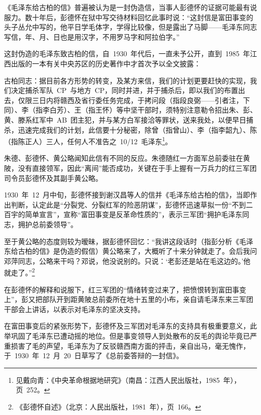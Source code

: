 《毛泽东给古柏的信》普遍被认为是一封伪造信，当事人彭德怀的证据可能最有说服力。数十年后，彭德怀在狱中写交待材料回忆此事时说：“这封信是富田事变的头子丛允中写的，他平日学毛体字，学得比较像，但是露出了马脚——毛泽东同志写信，年、月、日也是用汉字，不用罗马字和阿拉伯字。”

这封伪造的毛泽东致古柏的信，自~1930~年代后，一直未予公开，直到~1985~年江西出版的一本有关中央苏区的历史著作中才首次予以全文披露：

\begin{quoting}
古柏同志：据目前各方形势的转变，及某方来信，我们的计划更要赶快的实现，我们决定捕杀军队~CP~与地方~CP，同时并进，并于捕杀后，即以我们的布置出去，仅限三日内将赣西及省行委任务完成，于拷问段（指段良弼——引者注，下同）、李（指李白芳）、王（指王怀）等中坚干部时，须特别注意勒令招出朱、彭、黄、滕系红军中~AB~团主犯，并与某方白军接洽等罪状，送来我处，以便早日捕杀，迅速完成我们的计划，此信要十分秘密，除曾（指曾山）、李（指李韶九）、陈（指陈正人）三人，任何人不准告之~10/12~毛泽东\footnote{见戴向青：《中央革命根据地研究》（南昌：江西人民出版社，1985~年），页~252。}。
\end{quoting}

朱德、彭德怀、黄公略闻知此信有不同的反应。朱德随红一方面军总前委驻在黄陂，没有直接领军，因此“离间”能否成功，关键在于手上握有一万兵力的红三军团司令员彭德怀及其副手黄公略。

1930~年~12~月中旬，彭德怀接到谢汉昌等人的信并《毛泽东给古柏的信》，当即作出判断，认定此是“分裂党、分裂红军的险恶阴谋”，彭德怀迅速草拟一份“不到二百宇的简单宣言”，宣称“富田事变是反革命性质的”，表示三军团“拥护毛泽东同志，拥护总前委领导”。

至于黄公略的态度则较为暧昧，据彭德怀回忆：“我讲这段话时（指彭分析《毛泽东给古柏的信》是伪造的假信）黄公略来了，大概听了十来分钟就走了。会后我问邓萍同志，公略来干吗？邓说，他没说别的。只说：‘老彭还是站在毛这边的。’他就走了。”\footnote{《彭德怀自述》（北京：人民出版社，1981~年），页~166。}

在彭德怀的解释和说服下，红三军团的“情绪转变过来了，把愤恨转到富田事变上”，彭又把部队开到距黄陂总前委所在地十五里的小布，亲自请毛泽东来三军团干部会上讲话，以表示对毛泽东的坚决支持。

在富田事变后的紧张形势下，彭德怀及三军团对毛泽东的支持具有极重要意义，此举巩固了毛泽东已遭动摇的地位。但是事变领导人到处散布的反毛的舆论毕竟已严重损害了毛的声望，毛泽东为了反驳赣西南方面的抨击，亲自出马，毫无愧作，于~1930~年~12~月~20~日草写了《总前委答辩的一封信》。

